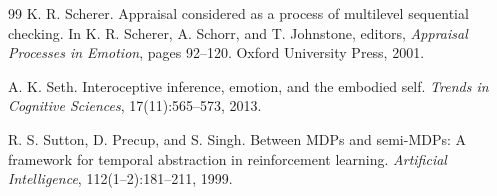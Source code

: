 \documentclass[11pt]{article}
\begin{document}
\begin{thebibliography}{99}
K. R. Scherer.
\newblock Appraisal considered as a process of multilevel sequential checking.
\newblock In K. R. Scherer, A. Schorr, and T. Johnstone, editors,
\emph{Appraisal Processes in Emotion}, pages 92--120. Oxford University Press,
2001.

A. K. Seth.
\newblock Interoceptive inference, emotion, and the embodied self.
\newblock \emph{Trends in Cognitive Sciences}, 17(11):565--573, 2013.

R. S. Sutton, D. Precup, and S. Singh.
\newblock Between MDPs and semi-MDPs: A framework for temporal abstraction in
reinforcement learning.
\newblock \emph{Artificial Intelligence}, 112(1--2):181--211, 1999.

\end{thebibliography}
\end{document}
